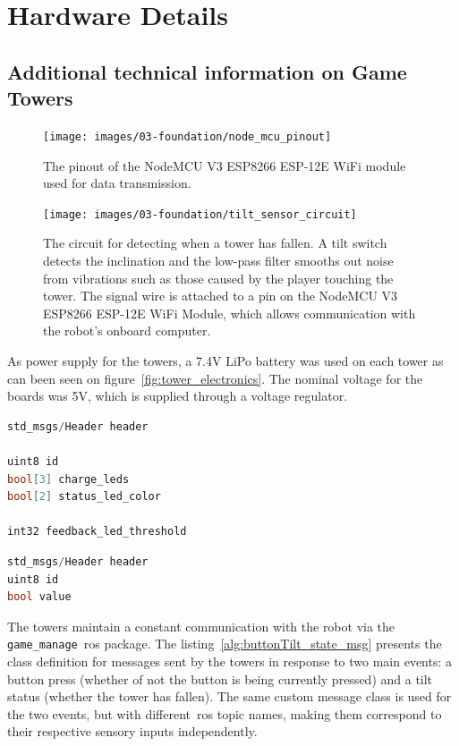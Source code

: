 \chapter{Hardware Details}\label{app:hard_appendix}

\section{Additional technical information on Game Towers}

\begin{figure}[h]
    \centering
    \texttt{[image: images/03-foundation/node\_mcu\_pinout]}
  \caption{The pinout of the NodeMCU V3 ESP8266 ESP-12E WiFi module used for data transmission.}
  \label{fig:tower_board}
\end{figure}

\begin{figure}[H]
	\centering
	\texttt{[image: images/03-foundation/tilt\_sensor\_circuit]}
	\caption{The circuit for detecting when a tower has fallen. A tilt switch detects the inclination and the low-pass filter smooths out noise from vibrations such as those caused by the player touching the tower. The signal wire is attached to a pin on the NodeMCU V3 ESP8266 ESP-12E WiFi Module, which allows communication with the robot's onboard computer.}
    \label{fig:tilt_circuit} 
\end{figure}

As power supply for the towers, a 7.4V LiPo battery was used on each tower as can been seen on figure~\ref{fig:tower_electronics}. The nominal voltage for the boards was 5V, which is supplied through a voltage regulator.

\begin{lstlisting}[language=C++, label={alg:tower_msg}, caption={Class definition for a message communicating tower led configurations.}]
std_msgs/Header header

uint8 id
bool[3] charge_leds
bool[2] status_led_color

int32 feedback_led_threshold
\end{lstlisting}


\begin{lstlisting}[language=C++, label={alg:buttonTilt_state_msg}, caption={Class definition for a message communicating tower button state and tilt state.}]
std_msgs/Header header
uint8 id
bool value
\end{lstlisting}

The towers maintain a constant communication with the robot via the \verb|game_manage|~\gls{ros} package. The listing~\ref{alg:buttonTilt_state_msg} presents the class definition for messages sent by the towers in response to two main events: a button press (whether of not the button is being currently pressed) and a tilt status (whether the tower has fallen). The same custom message class is used for the two events, but with different~\gls{ros} topic names, making them correspond to their respective sensory inputs independently.


